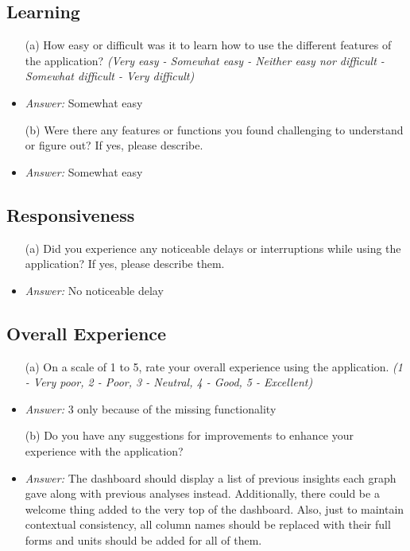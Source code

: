 \documentclass{article}
\begin{document}
\subsection*{\textbf{Learning}}
  \begin{itemize}
    \item[(a)] How easy or difficult was it to learn how to use the different
    features of the application? \textit{(Very easy - Somewhat easy - Neither
    easy nor difficult - Somewhat difficult - Very difficult)}
    \item \emph{Answer:} Somewhat easy
    \item[(b)] Were there any features or functions you found challenging to
    understand or figure out? If yes, please describe. 
    \item \emph{Answer:} Somewhat easy
  \end{itemize}

\subsection*{\textbf{Responsiveness}}
  \begin{itemize}
    \item[(a)] Did you experience any noticeable delays or interruptions while
    using the application? If yes, please describe them.
    \item \emph{Answer:} No noticeable delay
  \end{itemize}

\subsection*{\textbf{Overall Experience}}
  \begin{itemize}
    \item[(a)] On a scale of 1 to 5, rate your overall experience using the
    application. \textit{(1 - Very poor, 2 - Poor, 3 - Neutral, 4 - Good, 5 -
    Excellent)}
    \item \emph{Answer:} 3 only because of the missing functionality
    \item[(b)] Do you have any suggestions for improvements to enhance your
    experience with the application?
    \item \emph{Answer:} The dashboard should display a list of previous insights each graph gave 
    along with previous analyses instead. Additionally, there could be a welcome thing added to the 
    very top of the dashboard. Also, just to maintain contextual consistency, all column names should 
    be replaced with their full forms and units should be added for all of them.
  \end{itemize}
\end{document}
